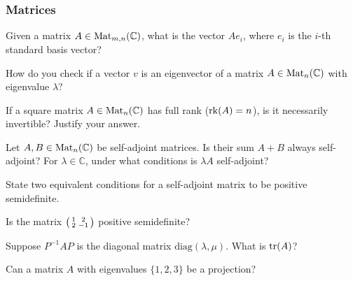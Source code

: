 \documentclass[a4paper, oneside, 12pt]{amsart}
\begin{document}
\subsubsection*{Matrices}
\begin{thmlist}
  \item Given a matrix \(A \in \operatorname{Mat}_{m,n}(\mathbb{C})\), what is the vector \(Ae_i\), where \(e_i\) is the \(i\)-th standard basis vector?
  \item How do you check if a vector \(v\) is an eigenvector of a matrix \(A \in \operatorname{Mat}_{n}( \mathbb{C})\) with eigenvalue \(\lambda\)?
  \item If a square matrix \(A \in \operatorname{Mat}_n(\mathbb{C})\) has full rank (\(\operatorname{rk}(A) = n\)), is it necessarily invertible? Justify your answer.
  \item Let \(A, B \in \operatorname{Mat}_{n}( \mathbb{C})\) be self-adjoint matrices.
  Is their sum \(A+B\) always self-adjoint?
  For \(\lambda \in \mathbb{C}\), under what conditions is \(\lambda A\) self-adjoint?
  \item State two equivalent conditions for a self-adjoint matrix to be positive semidefinite.
  \item Is the matrix \(\begin{psmallmatrix} 1 & 2 \\ 2 & -1 \end{psmallmatrix}\) positive semidefinite?
  \item Suppose \(P^{-1}AP\) is the diagonal matrix \(\mathrm{diag}(\lambda, \mu)\). What is \(\operatorname{tr}(A)\)?
  \item Can a matrix \(A\) with eigenvalues \(\{1, 2, 3\}\) be a projection?
\end{thmlist}
\end{document}
